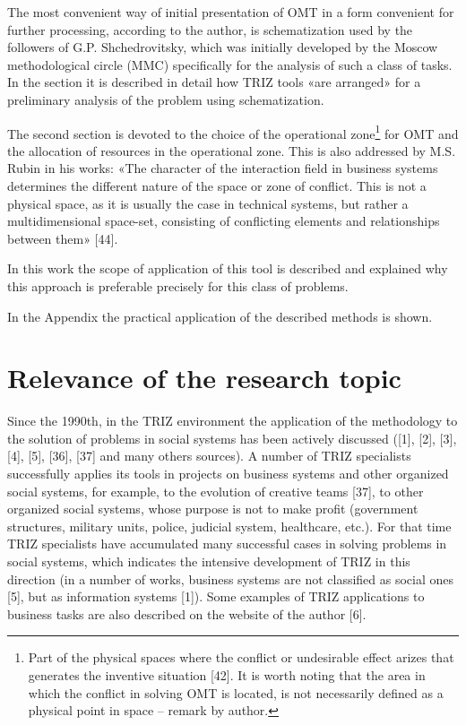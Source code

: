 \documentclass[11pt,a4paper]{book}
\begin{document}
The most convenient way of initial presentation of OMT in a form convenient
for further processing, according to the author, is schematization used by the
followers of G.P. Shchedrovitsky, which was initially developed by the Moscow
methodological circle (MMC) specifically for the analysis of such a class of
tasks. In the section it is described in detail how TRIZ tools «are arranged»
for a preliminary analysis of the problem using schematization.

The second section is devoted to the choice of the operational
zone\footnote{Part of the physical spaces where the conflict or undesirable
  effect arizes that generates the inventive situation [42]. It is worth
  noting that the area in which the conflict in solving OMT is located, is not
  necessarily defined as a physical point in space -- remark by author.} for
OMT and the allocation of resources in the operational zone. This is also
addressed by M.S. Rubin in his works: «The character of the interaction field
in business systems determines the different nature of the space or zone of
conflict. This is not a physical space, as it is usually the case in technical
systems, but rather a multidimensional space-set, consisting of conflicting
elements and relationships between them» [44].

In this work the scope of application of this tool is described and explained
why this approach is preferable precisely for this class of problems.

In the Appendix the practical application of the described methods is shown.

\section{Relevance of the research topic}

Since the 1990th, in the TRIZ environment the application of the methodology
to the solution of problems in social systems has been actively discussed
([1], [2], [3], [4], [5], [36], [37] and many others sources). A number of
TRIZ specialists successfully applies its tools in projects on business
systems and other organized social systems, for example, to the evolution of
creative teams [37], to other organized social systems, whose purpose is not
to make profit (government structures, military units, police, judicial
system, healthcare, etc.). For that time TRIZ specialists have accumulated
many successful cases in solving problems in social systems, which indicates
the intensive development of TRIZ in this direction (in a number of works,
business systems are not classified as social ones [5], but as information
systems [1]). Some examples of TRIZ applications to business tasks are also
described on the website of the author [6].
\end{document}
